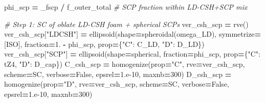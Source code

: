\documentclass[
  a4paper,
  numbers=noendperiod,
  DIV=12]{scrreprt}
\newenvironment{Shaded}{\begin{snugshade}}{\end{snugshade}}
\newcommand{\CommentTok}[1]{\textcolor[rgb]{0.56,0.35,0.01}{\textit{#1}}}
\newcommand{\DecValTok}[1]{\textcolor[rgb]{0.00,0.00,0.81}{#1}}
\newcommand{\FloatTok}[1]{\textcolor[rgb]{0.00,0.00,0.81}{#1}}
\newcommand{\NormalTok}[1]{#1}
\newcommand{\OperatorTok}[1]{\textcolor[rgb]{0.81,0.36,0.00}{\textbf{#1}}}
\newcommand{\StringTok}[1]{\textcolor[rgb]{0.31,0.60,0.02}{#1}}
\newcommand{\VariableTok}[1]{\textcolor[rgb]{0.00,0.00,0.00}{#1}}
\begin{document}
\begin{Shaded}
\begin{Highlighting}[]
\NormalTok{    phi\_scp }\OperatorTok{=}\NormalTok{ \_fscp }\OperatorTok{/}\NormalTok{ f\_outer\_total     }\CommentTok{\# SCP fraction within LD{-}CSH+SCP mix}

    \CommentTok{\# Step 1: SC of oblate LD{-}CSH foam + spherical SCPs}
\NormalTok{    ver\_csh\_scp }\OperatorTok{=}\NormalTok{ rve()}
\NormalTok{    ver\_csh\_scp[}\StringTok{"LDCSH"}\NormalTok{] }\OperatorTok{=}\NormalTok{ ellipsoid(shape}\OperatorTok{=}\NormalTok{spheroidal(omega\_LD), symmetrize}\OperatorTok{=}\NormalTok{[ISO],}
\NormalTok{                                     fraction}\OperatorTok{=}\FloatTok{1.} \OperatorTok{{-}}\NormalTok{ phi\_scp,}
\NormalTok{                                     prop}\OperatorTok{=}\NormalTok{\{}\StringTok{"C"}\NormalTok{: C\_LD, }\StringTok{"D"}\NormalTok{: D\_LD\})}
\NormalTok{    ver\_csh\_scp[}\StringTok{"SCP"}\NormalTok{]   }\OperatorTok{=}\NormalTok{ ellipsoid(shape}\OperatorTok{=}\NormalTok{spherical, fraction}\OperatorTok{=}\NormalTok{phi\_scp,}
\NormalTok{                                     prop}\OperatorTok{=}\NormalTok{\{}\StringTok{"C"}\NormalTok{: tZ4,  }\StringTok{"D"}\NormalTok{: D\_cap\})}
\NormalTok{    C\_csh\_scp }\OperatorTok{=}\NormalTok{ homogenize(prop}\OperatorTok{=}\StringTok{"C"}\NormalTok{, rve}\OperatorTok{=}\NormalTok{ver\_csh\_scp, scheme}\OperatorTok{=}\NormalTok{SC,}
\NormalTok{                            verbose}\OperatorTok{=}\VariableTok{False}\NormalTok{, epsrel}\OperatorTok{=}\FloatTok{1.e{-}10}\NormalTok{, maxnb}\OperatorTok{=}\DecValTok{300}\NormalTok{)}
\NormalTok{    D\_csh\_scp }\OperatorTok{=}\NormalTok{ homogenize(prop}\OperatorTok{=}\StringTok{"D"}\NormalTok{, rve}\OperatorTok{=}\NormalTok{ver\_csh\_scp, scheme}\OperatorTok{=}\NormalTok{SC,}
\NormalTok{                            verbose}\OperatorTok{=}\VariableTok{False}\NormalTok{, epsrel}\OperatorTok{=}\FloatTok{1.e{-}10}\NormalTok{, maxnb}\OperatorTok{=}\DecValTok{300}\NormalTok{)}


\end{Highlighting}
\end{Shaded}
\end{document}
